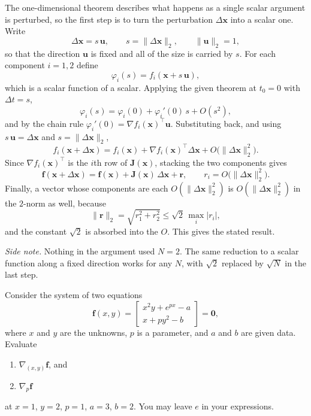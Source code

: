 \begin{solution}
    
    The one-dimensional theorem describes what happens as a single scalar argument is perturbed, so the first step is to turn the perturbation $\Delta\mathbf{x}$ into a scalar one. Write
    \[
        \Delta\mathbf{x} = s\,\mathbf{u}, \qquad s = \|\Delta\mathbf{x}\|_2, \qquad \|\mathbf{u}\|_2 = 1,
    \]
    so that the direction $\mathbf{u}$ is fixed and all of the size is carried by $s$. For each component $i = 1, 2$ define
    \[
        \varphi_i(s) = f_i(\mathbf{x} + s\,\mathbf{u}),
    \]
    which is a scalar function of a scalar. Applying the given theorem at $t_0 = 0$ with $\Delta t = s$,
    \[
        \varphi_i(s) = \varphi_i(0) + \varphi_i'(0)\, s + O(s^2),
    \]
    and by the chain rule $\varphi_i'(0) = \nabla f_i(\mathbf{x})^\top \mathbf{u}$. Substituting back, and using $s\,\mathbf{u} = \Delta\mathbf{x}$ and $s = \|\Delta\mathbf{x}\|_2$,
    \[
        f_i(\mathbf{x} + \Delta\mathbf{x}) = f_i(\mathbf{x}) + \nabla f_i(\mathbf{x})^\top \Delta\mathbf{x} + O\big(\|\Delta\mathbf{x}\|_2^2\big).
    \]
    Since $\nabla f_i(\mathbf{x})^\top$ is the $i$th row of $\mathbf{J}(\mathbf{x})$, stacking the two components gives
    \[
        \mathbf{f}(\mathbf{x} + \Delta\mathbf{x}) = \mathbf{f}(\mathbf{x}) + \mathbf{J}(\mathbf{x})\, \Delta\mathbf{x} + \mathbf{r},
        \qquad r_i = O\big(\|\Delta\mathbf{x}\|_2^2\big) .
    \]
    Finally, a vector whose components are each $O(\|\Delta\mathbf{x}\|_2^2)$ is $O(\|\Delta\mathbf{x}\|_2^2)$ in the $2$-norm as well, because
    \[
        \|\mathbf{r}\|_2 = \sqrt{r_1^2 + r_2^2} \le \sqrt{2}\, \max_i |r_i| ,
    \]
    and the constant $\sqrt{2}$ is absorbed into the $O$. This gives the stated result.

    \emph{Side note.} Nothing in the argument used $N = 2$. The same reduction to a scalar function along a fixed direction works for any $N$, with $\sqrt{2}$ replaced by $\sqrt{N}$ in the last step.
    
\end{solution}

\begin{exercise} %
    
    Consider the system of two equations
    \[
        \mathbf{f}(x, y) =
        \begin{bmatrix}
            x^2 y + e^{p x} - a \\
            x + p y^2 - b
        \end{bmatrix} = \mathbf{0},
    \]
    where $x$ and $y$ are the unknowns, $p$ is a parameter, and $a$ and $b$ are given data. Evaluate
    \begin{enumerate}[label=(\alph*)]
        \item $\nabla_{(x,y)} \mathbf{f}$, and
        \item $\nabla_{p} \mathbf{f}$
    \end{enumerate}
    at $x = 1$, $y = 2$, $p = 1$, $a = 3$, $b = 2$. You may leave $e$ in your expressions.
    
\end{exercise}

